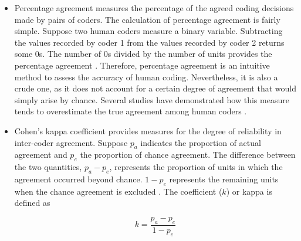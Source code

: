 \documentclass[12 pt]{article}
\begin{document}
\begin{itemize}
    \item Percentage agreement measures the percentage of the agreed coding decisions made by pairs of coders. The calculation of percentage agreement is fairly simple. Suppose two human coders measure a binary variable. Subtracting the values recorded by coder 1 from the values recorded by coder 2 returns some 0s. The number of 0s divided by the number of units provides the percentage agreement \citep[278]{mchugh2012interrater}. Therefore, percentage agreement is an intuitive method to assess the accuracy of human coding. Nevertheless, it is also a crude one, as it does not account for a certain degree of agreement that would simply arise by chance. Several studies have demonstrated how this measure tends to overestimate the true agreement among human coders \citep{birkimer1979back, suen1985effects, lombard2002content}. 
    \item Cohen's kappa coefficient provides measures for the degree of reliability in inter-coder agreement. Suppose $p_{a}$ indicates the proportion of actual agreement and $p_{e}$ the proportion of chance agreement. The difference between the two quantities, $p_{a} - p_{e}$, represents the proportion of units in which the agreement occurred beyond chance. $1-p_{e}$ represents the remaining units when the chance agreement is excluded \citep[39-40]{cohen1960coefficient}. The coefficient ($k$) or kappa is defined as 
    
    \begin{equation}
    k = \frac{p_{a} - p_{e}}{1 - p_{e}} 
    \end{equation}
    

\end{itemize}
\end{document}
